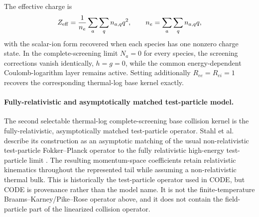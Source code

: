 \documentclass[11pt]{article}
\begin{document}
The effective charge is
\begin{equation}
 Z_{\rm eff}=\frac{1}{n_e}\sum_a\sum_q n_{a,q}q^2,
 \qquad
 n_e=\sum_a\sum_q n_{a,q}q,
 \label{eq:physical_zeff_resolved}
\end{equation}
with the scalar-ion form recovered when each species has one nonzero charge state.
In the complete-screening limit $N_a=0$ for every species, the screening corrections
vanish identically, $h=g=0$, while the common energy-dependent Coulomb-logarithm layer
remains active.  Setting additionally $R_{ee}=R_{ei}=1$ recovers the corresponding
thermal-log base kernel exactly.


\paragraph{Fully-relativistic and asymptotically matched test-particle model.}
The second selectable thermal-log complete-screening base collision kernel is the fully-relativistic,
asymptotically matched test-particle operator.  Stahl et al. describe its construction as
an asymptotic matching of the usual non-relativistic test-particle Fokker--Planck
operator to the fully relativistic high-energy test-particle limit
\cite{Stahl2016}.  The resulting momentum-space coefficients retain relativistic
kinematics throughout the represented tail while assuming a non-relativistic thermal
bulk.  This is historically the test-particle operator used in CODE, but CODE is
provenance rather than the model name.  It is not the finite-temperature
Braams--Karney/Pike--Rose operator above, and it does not contain the field-particle part
of the linearized collision operator.
\end{document}
